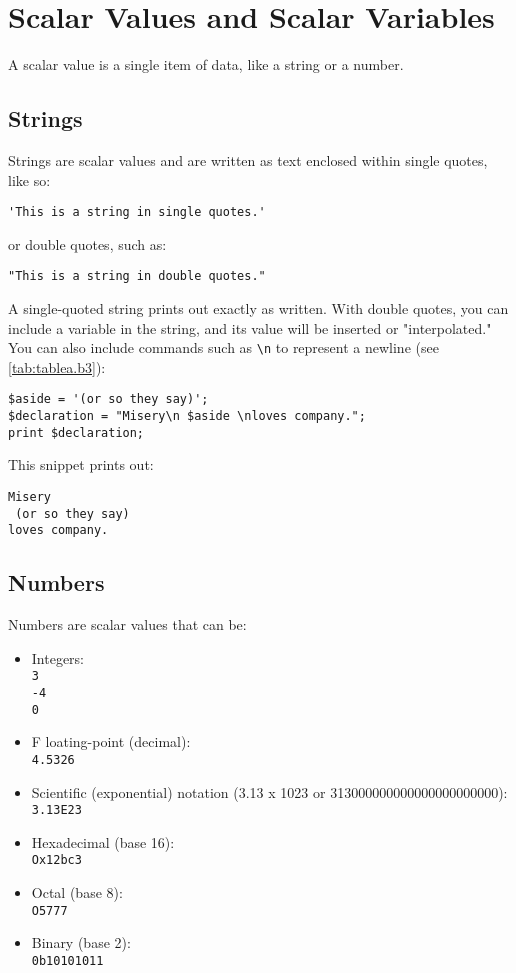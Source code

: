 \section{Scalar Values and Scalar Variables}
A scalar value is a single item of data, like a string or a number.

\subsection{Strings}
Strings are scalar values and are written as text enclosed within single quotes, like so:

\begin{lstlisting}
'This is a string in single quotes.'
\end{lstlisting}

or double quotes, such as:

\begin{lstlisting}
"This is a string in double quotes."
\end{lstlisting}

A single-quoted string prints out exactly as written. With double quotes, you can include a variable in the string, and its value will be inserted or "interpolated." You can also include commands such as \verb|\n| to represent a newline (see \autoref{tab:tablea.b3}):

\begin{lstlisting}
$aside = '(or so they say)';
$declaration = "Misery\n $aside \nloves company.";
print $declaration;
\end{lstlisting}

This snippet prints out:

\begin{lstlisting}
Misery 
 (or so they say) 
loves company.
\end{lstlisting}

\subsection{Numbers}
Numbers are scalar values that can be:

\begin{itemize}
  \item Integers:\\ \verb|3|\\ \verb|-4|\\ \verb|0|
  \item F loating-point (decimal):\\ \verb|4.5326|
  \item Scientific (exponential) notation (3.13 x 1023 or 313000000000000000000000):\\ \verb|3.13E23|
  \item Hexadecimal (base 16):\\ \verb|Ox12bc3|
  \item Octal (base 8):\\ \verb|O5777|
  \item Binary (base 2):\\ \verb|0b10101011|
\end{itemize}

